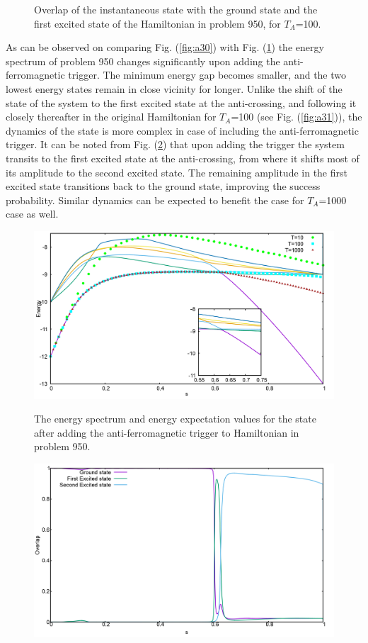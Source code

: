 \documentclass[../main.tex]{subfiles}
\begin{document}
\begin{itemize}
\begin{figure}[H]
\caption{Overlap of the instantaneous state with the ground state and the first excited state of the Hamiltonian in problem 950, for $T_A$=100.}
\end{figure}
As can be observed on comparing Fig. (\ref{fig:a30}) with Fig. (\ref{fig:a32}) the energy spectrum of problem 950 changes significantly upon adding the anti-ferromagnetic trigger. The minimum energy gap becomes smaller, and the two lowest energy states remain in close vicinity for longer. Unlike the shift of the state of the system to the first excited state at the anti-crossing, and following it closely thereafter in the original Hamiltonian for $T_A$=100 (see Fig. (\ref{fig:a31})), the dynamics of the state is more complex in case of including the anti-ferromagnetic trigger. It can be noted from Fig. (\ref{fig:a33}) that upon adding the trigger the system transits to the first excited state at the anti-crossing, from where it shifts most of its amplitude to the second excited state. The remaining amplitude in the first excited state transitions back to the ground state, improving the success probability. Similar dynamics can be expected to benefit the case for $T_A$=1000 case as well.
\begin{figure}[H]
\centering
  \includegraphics[scale=0.24]{950_s12_A_g1.png}
  \label{fig:a32}
  \caption{The energy spectrum and energy expectation values for the state after adding the anti-ferromagnetic trigger to Hamiltonian in problem 950.}
 \end{figure}

\begin{figure}[H]
  \centering
  \includegraphics[scale=0.24]{950_A_g1_Overlap.png}
  \label{fig:a33}


\end{figure}
\end{itemize}
\end{document}

